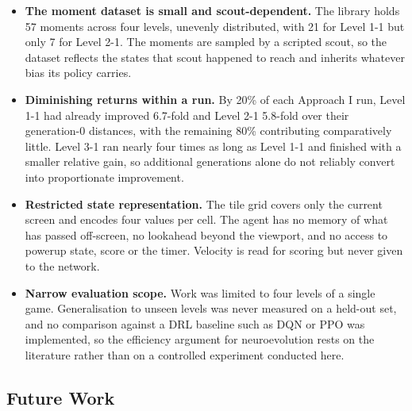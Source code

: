 \begin{itemize}
    \item \textbf{The moment dataset is small and scout-dependent.} The library
    holds 57 moments across four levels, unevenly distributed, with 21 for
    Level 1-1 but only 7 for Level 2-1. The moments are sampled by a scripted
    scout, so the dataset reflects the states that scout happened to reach and
    inherits whatever bias its policy carries.

    \item \textbf{Diminishing returns within a run.} By 20\% of each Approach I
    run, Level 1-1 had already improved 6.7-fold and Level 2-1 5.8-fold over
    their generation-0 distances, with the remaining 80\% contributing
    comparatively little. Level 3-1 ran nearly four times as long as Level 1-1
    and finished with a smaller relative gain, so additional generations alone
    do not reliably convert into proportionate improvement.

    \item \textbf{Restricted state representation.} The tile grid covers only
    the current screen and encodes four values per cell. The agent has no
    memory of what has passed off-screen, no lookahead beyond the viewport, and
    no access to powerup state, score or the timer. Velocity is read for
    scoring but never given to the network.

    \item \textbf{Narrow evaluation scope.} Work was limited to four levels of
    a single game. Generalisation to unseen levels was never measured on a
    held-out set, and no comparison against a DRL baseline such as DQN or PPO
    was implemented, so the efficiency argument for neuroevolution rests on
    the literature rather than on a controlled experiment conducted here.
\end{itemize}

\subsection{Future Work}
\label{subsec:future-work}

